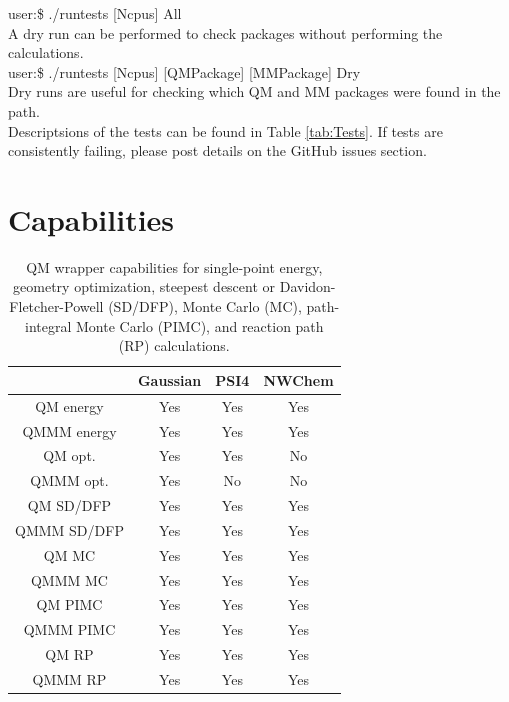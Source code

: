 \documentclass[12pt]{report}
\begin{document}
user:\$ ./runtests [Ncpus] All \\

A dry run can be performed to check packages without performing the
calculations. \\

user:\$ ./runtests [Ncpus] [QMPackage] [MMPackage] Dry \\

Dry runs are useful for checking which QM and MM packages were found in the
path. \\

Descriptsions of the tests can be found in Table \ref{tab:Tests}.
If tests are consistently failing, please post details on the GitHub issues
section.

\section{Capabilities}

\begin{table}[hbt]
 \centering
 \begin{tabular}{|c|c c c|}
 \hline
  & Gaussian & PSI4 & NWChem \\ \hline
 QM energy & Yes & Yes & Yes \\
 QMMM energy & Yes & Yes & Yes \\ \hline
 QM opt. & Yes & Yes & No \\
 QMMM opt. & Yes & No & No \\ \hline
 QM SD/DFP & Yes & Yes & Yes \\
 QMMM SD/DFP & Yes & Yes & Yes \\ \hline
 QM MC & Yes & Yes & Yes \\
 QMMM MC & Yes & Yes & Yes \\ \hline
 QM PIMC & Yes & Yes & Yes \\
 QMMM PIMC & Yes & Yes & Yes \\ \hline
 QM RP & Yes & Yes & Yes \\
 QMMM RP & Yes & Yes & Yes \\ \hline
 \end{tabular}
 \caption{
 QM wrapper capabilities for single-point energy, geometry optimization,
 steepest descent or Davidon-Fletcher-Powell (SD/DFP), Monte Carlo (MC),
 path-integral Monte Carlo (PIMC), and reaction path (RP) calculations.}
 \label{tab:QMWrapCap}
\end{table}
\end{document}
